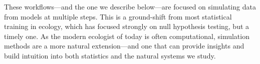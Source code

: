 These workflows---and the one we describe below---are focused on simulating data from models at multiple steps. This is a ground-shift from most statistical training in ecology, which has focused strongly on null hypothesis testing, but a timely one. As the modern ecologist of today is often computational, simulation methods are a more natural extension---and one that can provide insights and build intuition into both statistics and the natural systems we study. %
